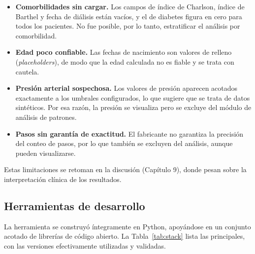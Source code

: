 \documentclass[12pt,a4paper]{article}
\begin{document}
    \begin{itemize}
        \item \textbf{Comorbilidades sin cargar.} Los campos de índice de Charlson, índice de Barthel y fecha de diálisis están vacíos, y el de diabetes figura en cero para todos los pacientes. No fue posible, por lo tanto, estratificar el análisis por comorbilidad.
        \item \textbf{Edad poco confiable.} Las fechas de nacimiento son valores de relleno (\textit{placeholders}), de modo que la edad calculada no es fiable y se trata con cautela.
        \item \textbf{Presión arterial sospechosa.} Los valores de presión aparecen acotados exactamente a los umbrales configurados, lo que sugiere que se trata de datos sintéticos. Por esa razón, la presión se visualiza pero se excluye del módulo de análisis de patrones.
        \item \textbf{Pasos sin garantía de exactitud.} El fabricante no garantiza la precisión del conteo de pasos, por lo que también se excluyen del análisis, aunque pueden visualizarse.
    \end{itemize}

    Estas limitaciones se retoman en la discusión (Capítulo 9), donde pesan sobre la interpretación clínica de los resultados.

    \subsection{Herramientas de desarrollo}
    La herramienta se construyó íntegramente en Python, apoyándose en un conjunto acotado de librerías de código abierto. La Tabla~\ref{tab:stack} lista las principales, con las versiones efectivamente utilizadas y validadas.
\end{document}
